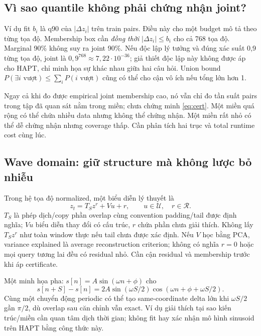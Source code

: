 \documentclass[11pt,a4paper]{article}
\theoremstyle{definition}
\begin{document}
\subsection{Vì sao quantile không phải chứng nhận joint?}
Ví dụ fit $b_i$ là q90 của $|\Delta z_i|$ trên train pairs. Điều này cho
một budget mô tả theo từng tọa độ. Membership box cần \emph{đồng thời}
$|\Delta z_i|\le b_i$ cho cả 768 tọa độ. Marginal 90\% không suy ra joint
90\%. Nếu độc lập lý tưởng và đúng xác suất 0,9 từng tọa độ, joint là
$0,9^{768}\approx7,22\cdot10^{-36}$; giả thiết độc lập này không được áp
cho HAPT, chỉ minh họa sự khác nhau giữa hai câu hỏi. Union bound
$P(\exists i\text{ vượt})\le\sum_iP(i\text{ vượt})$ cũng có thể cho cận
vô ích nếu tổng lớn hơn 1.

Ngay cả khi đo được empirical joint membership cao, nó vẫn chỉ đo tần suất
pairs trong tập đã quan sát nằm trong miền; chưa chứng minh
\eqref{eq:cert}. Một miền quá rộng có thể chứa nhiều data nhưng không thể
chứng nhận. Một miền rất nhỏ có thể dễ chứng nhận nhưng coverage thấp.
Cần phân tích hai trục và total runtime cost cùng lúc.

\subsection{Wave domain: giữ structure mà không lược bỏ nhiễu}
Trong hệ tọa độ normalized, một biểu diễn lý thuyết là
\begin{equation}
z_t=T_Sz^r+Vu+r,\qquad u\in\mathcal U,\quad r\in\mathcal R.
\end{equation}
$T_S$ là phép dịch/copy phần overlap cùng convention padding/tail được
định nghĩa; $Vu$ biểu diễn thay đổi có cấu trúc, $r$ chứa phần chưa giải
thích. Không lấy $T_Sz^r$ như toàn window thực nếu tail chưa được xác định.
Nếu $V$ học bằng PCA, variance explained là average reconstruction
criterion; không có nghĩa $r=0$ hoặc mọi query tương lai đều có residual
nhỏ. Cần cận residual và membership trước khi áp certificate.

Một minh họa pha: $s[n]=A\sin(\omega n+\phi)$ cho
\begin{equation}
s[n+S]-s[n]=2A\sin(\omega S/2)
\cos(\omega n+\phi+\omega S/2).
\end{equation}
Cùng một chuyển động periodic có thể tạo same-coordinate delta lớn khi
$\omega S/2$ gần $\pi/2$, dù overlap sau căn chỉnh vẫn exact. Ví dụ giải
thích tại sao kiến trúc/miền cần quan tâm dịch thời gian; không fit hay xác
nhận mô hình sinusoid trên HAPT bằng công thức này.
\end{document}
